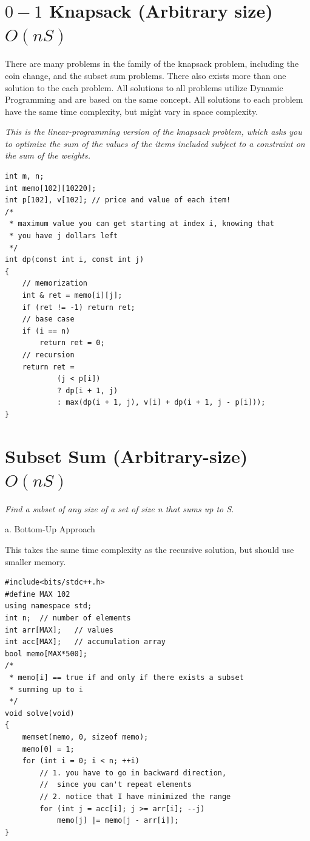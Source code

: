 \documentclass[12pt]{book}
\begin{document}
\section{$0-1$ Knapsack (Arbitrary size) $O(nS)$}
There are many problems in the family of the knapsack problem, including the coin change, and the subset sum problems. There also exists more than one solution to the each problem. All solutions to all problems utilize Dynamic Programming and are based on the same concept. All solutions to each problem have the same time complexity, but might vary in space complexity.

\textit{This is the linear-programming version of the knapsack problem, which asks you to optimize the sum of the values of the items included subject to a constraint on the sum of the weights.}

\begin{verbatim}
int m, n;
int memo[102][10220];
int p[102], v[102];	// price and value of each item!
/*
 * maximum value you can get starting at index i, knowing that
 * you have j dollars left
 */
int dp(const int i, const int j)
{
	// memorization
	int & ret = memo[i][j];
	if (ret != -1) return ret;
	// base case
	if (i == n)
		return ret = 0;
	// recursion
	return ret =
			(j < p[i])
			? dp(i + 1, j)
			: max(dp(i + 1, j), v[i] + dp(i + 1, j - p[i]));
}
\end{verbatim}
\section{Subset Sum (Arbitrary-size) $O(nS)$}
\textit{Find a subset of any size of a set of size n that sums up to S.}

a. Bottom-Up Approach

This takes the same time complexity as the recursive solution, but should use smaller memory.
\begin{verbatim}
#include<bits/stdc++.h>
#define MAX 102
using namespace std;
int n;	// number of elements
int arr[MAX];	// values
int acc[MAX];	// accumulation array
bool memo[MAX*500];
/*
 * memo[i] == true if and only if there exists a subset
 * summing up to i
 */
void solve(void)
{
	memset(memo, 0, sizeof memo);
	memo[0] = 1;
	for (int i = 0; i < n; ++i)
		// 1. you have to go in backward direction,
		// 	since you can't repeat elements
		// 2. notice that I have minimized the range
		for (int j = acc[i]; j >= arr[i]; --j)
			memo[j] |= memo[j - arr[i]];
}
\end{verbatim}
\end{document}
